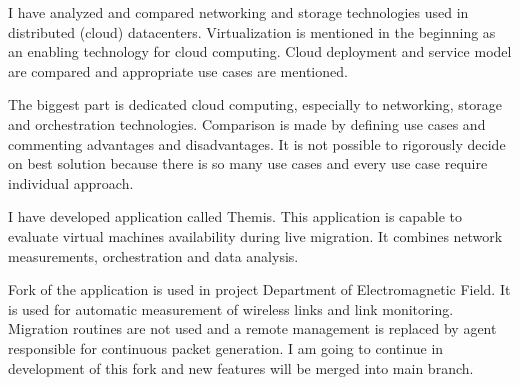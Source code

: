 
I have analyzed and compared networking and storage technologies used in distributed (cloud) datacenters. Virtualization is mentioned in the beginning as an enabling technology for cloud computing. Cloud deployment and service model are compared and appropriate use cases are mentioned.

The biggest part is dedicated cloud computing, especially to networking, storage and orchestration technologies. Comparison is made by defining use cases and commenting advantages and disadvantages. It is not possible to rigorously decide on best solution because there is so many use cases and every use case require individual approach.








I have developed application called Themis. This application is capable to evaluate virtual machines availability during live migration. It combines network measurements, orchestration and data analysis.



Fork of the application is used in project Department of Electromagnetic Field. It is used for automatic measurement of wireless links and link monitoring. Migration routines are not used and a remote management is replaced by agent responsible for continuous packet generation. I am going to continue in development of this fork and new features will be merged into main branch.


